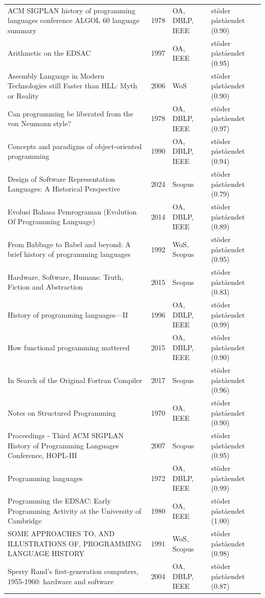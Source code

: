 \begin{longtable}{@{}%
  >{\raggedright\arraybackslash}p{}c%
  >{\raggedright\arraybackslash}p{}%
  >{\raggedright\arraybackslash}p{}@{}}
ACM SIGPLAN history of programming languages conference ALGOL 60 language summary & 1978 & OA, DBLP, IEEE & stöder påståendet (0.90) \\
Arithmetic on the EDSAC & 1997 & OA, IEEE & stöder påståendet (0.95) \\
Assembly Language in Modern Technologies still Faster than HLL: Myth or Reality & 2006 & WoS & stöder påståendet (0.90) \\
Can programming be liberated from the von Neumann style? & 1978 & OA, DBLP, IEEE & stöder påståendet (0.97) \\
Concepts and paradigms of object-oriented programming & 1990 & OA, DBLP, IEEE & stöder påståendet (0.94) \\
Design of Software Representation Languages: A Historical Perspective & 2024 & Scopus & stöder påståendet (0.79) \\
Evolusi Bahasa Pemrograman (Evolution Of Programming Language) & 2014 & OA, DBLP, IEEE & stöder påståendet (0.89) \\
From Babbage to Babel and beyond: A brief history of programming languages & 1992 & WoS, Scopus & stöder påståendet (0.95) \\
Hardware, Software, Humans: Truth, Fiction and Abstraction & 2015 & Scopus & stöder påståendet (0.83) \\
History of programming languages---II & 1996 & OA, DBLP, IEEE & stöder påståendet (0.99) \\
How functional programming mattered & 2015 & OA, DBLP, IEEE & stöder påståendet (0.90) \\
In Search of the Original Fortran Compiler & 2017 & Scopus & stöder påståendet (0.96) \\
Notes on Structured Programming & 1970 & OA, IEEE & stöder påståendet (0.90) \\
Proceedings - Third ACM SIGPLAN History of Programming Languages Conference, HOPL-III & 2007 & Scopus & stöder påståendet (0.95) \\
Programming languages & 1972 & OA, DBLP, IEEE & stöder påståendet (0.99) \\
Programming the EDSAC: Early Programming Activity at the University of Cambridge & 1980 & OA, IEEE & stöder påståendet (1.00) \\
SOME APPROACHES TO, AND ILLUSTRATIONS OF, PROGRAMMING LANGUAGE HISTORY & 1991 & WoS, Scopus & stöder påståendet (0.98) \\
Sperry Rand's first-generation computers, 1955-1960: hardware and software & 2004 & OA, DBLP, IEEE & stöder påståendet (0.87) \\

\end{longtable}
